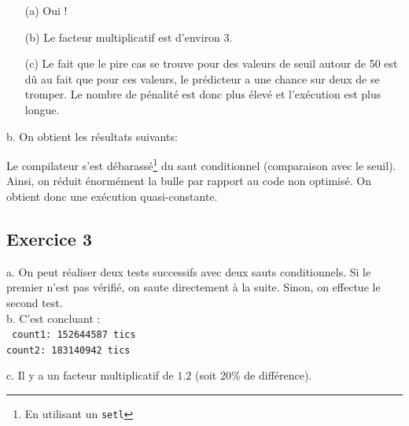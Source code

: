 \documentclass[11pt, a4 paper]{article}
\begin{document}
\begin{itemize}
    \item[(a)] Oui !\\
    \item[(b)] Le facteur multiplicatif est d'environ 3.\\
    \item[(c)] Le fait que le pire cas se trouve pour des valeurs de seuil autour de 50 est dû au fait que pour ces valeurs, le prédicteur a une chance sur deux de se tromper. Le nombre de pénalité est donc plus élevé et l'exécution est plus longue.\\
\end{itemize}

b. On obtient les résultats suivants:
\begin{figure}[!h]
\end{figure}

Le compilateur s'est débarassé\footnote{En utilisant un \texttt{setl}} du saut conditionnel (comparaison avec le seuil). Ainsi, on réduit énormément la bulle par rapport au code non optimisé. On obtient donc une exécution quasi-constante.\\

\subsection{Exercice 3}
a. On peut réaliser deux tests successifs avec deux sauts conditionnels. Si le premier n'est pas vérifié, on saute directement à la suite. Sinon, on effectue le second test.\\

b. C'est concluant :\\
\texttt{
count1: 152644587 tics\\
count2: 183140942 tics\\
}

c. Il y a un facteur multiplicatif de $1.2$ (soit 20\% de différence).\\
\end{document}
